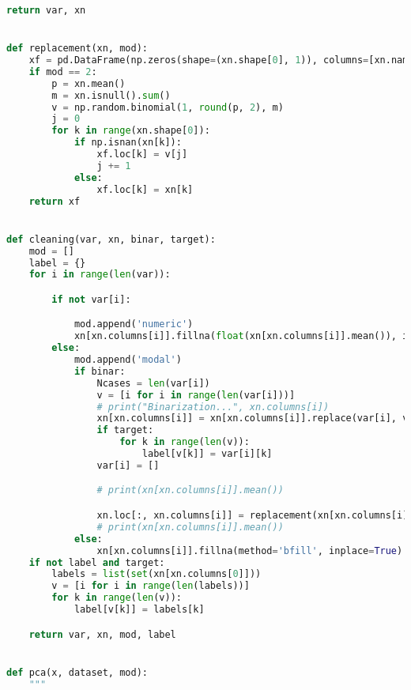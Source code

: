 \documentclass[11pt,a4paper]{article}
\begin{document}
\begin{lstlisting}[language=Python,basicstyle=\tiny]
    return var, xn


def replacement(xn, mod):
    xf = pd.DataFrame(np.zeros(shape=(xn.shape[0], 1)), columns=[xn.name], index=np.arange(0, xn.shape[0]))
    if mod == 2:
        p = xn.mean()
        m = xn.isnull().sum()
        v = np.random.binomial(1, round(p, 2), m)
        j = 0
        for k in range(xn.shape[0]):
            if np.isnan(xn[k]):
                xf.loc[k] = v[j]
                j += 1
            else:
                xf.loc[k] = xn[k]
    return xf


def cleaning(var, xn, binar, target):
    mod = []
    label = {}
    for i in range(len(var)):

        if not var[i]:

            mod.append('numeric')
            xn[xn.columns[i]].fillna(float(xn[xn.columns[i]].mean()), inplace=True)
        else:
            mod.append('modal')
            if binar:
                Ncases = len(var[i])
                v = [i for i in range(len(var[i]))]
                # print("Binarization...", xn.columns[i])
                xn[xn.columns[i]] = xn[xn.columns[i]].replace(var[i], v)
                if target:
                    for k in range(len(v)):
                        label[v[k]] = var[i][k]
                var[i] = []

                # print(xn[xn.columns[i]].mean())

                xn.loc[:, xn.columns[i]] = replacement(xn[xn.columns[i]], Ncases)
                # print(xn[xn.columns[i]].mean())
            else:
                xn[xn.columns[i]].fillna(method='bfill', inplace=True)
    if not label and target:
        labels = list(set(xn[xn.columns[0]]))
        v = [i for i in range(len(labels))]
        for k in range(len(v)):
            label[v[k]] = labels[k]

    return var, xn, mod, label


def pca(x, dataset, mod):
    """


\end{lstlisting}
\end{document}

